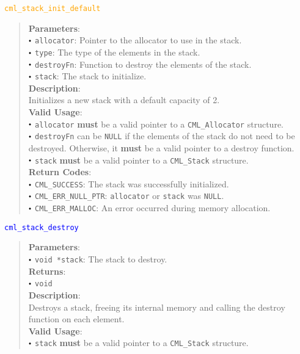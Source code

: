 \documentclass[a4paper,oneside,8pt]{extarticle}
\newcommand{\function}[1]{
  \noindent\textcolor{blue}{\texttt{#1}}
  \vspace{-0.3em}
}
\newcommand{\macro}[1]{
  \noindent\textcolor{orange}{\texttt{#1}}
  \vspace{-0.3em}
}
\renewcommand{\dot}{\raisebox{0.3ex}{\scalebox{0.6}{$\bullet$}}}
\theoremstyle{definition}
\begin{document}
\macro{cml\_stack\_init\_default}
\begin{quote}
  \textbf{Parameters}: \\
  $\dot$ \texttt{allocator}: Pointer to the allocator to use in the stack. \\
  $\dot$ \texttt{type}: The type of the elements in the stack. \\
  $\dot$ \texttt{destroyFn}: Function to destroy the elements of the stack. \\
  $\dot$ \texttt{stack}: The stack to initialize. \\
  
  \vspace{-0.75em}
  \textbf{Description}: \\
  Initializes a new stack with a default capacity of 2. \\

  \vspace{-0.75em}
  \textbf{Valid Usage}: \\
  $\dot$ \texttt{allocator} \textbf{must} be a valid pointer to a \texttt{CML\_Allocator} structure. \\
  $\dot$ \texttt{destroyFn} can be \texttt{NULL} if the elements of the stack do not need to be destroyed. Otherwise, it \textbf{must} be a valid pointer to a destroy function. \\
  $\dot$ \texttt{stack} \textbf{must} be a valid pointer to a \texttt{CML\_Stack} structure. \\

  \vspace{-0.75em}
  \textbf{Return Codes}: \\
  $\dot$ \texttt{CML\_SUCCESS}: The stack was successfully initialized. \\
  $\dot$ \texttt{CML\_ERR\_NULL\_PTR}: \texttt{allocator} or \texttt{stack} was \texttt{NULL}. \\
  $\dot$ \texttt{CML\_ERR\_MALLOC}: An error occurred during memory allocation. \\
\end{quote}

\function{cml\_stack\_destroy}
\begin{quote}
  \textbf{Parameters}: \\
  $\dot$ \texttt{void *stack}: The stack to destroy. \\
  \textbf{Returns}: \\
  $\dot$ \texttt{void} \\
  
  \vspace{-0.75em}
  \textbf{Description}: \\
  Destroys a stack, freeing its internal memory and calling the destroy function on each element. \\

  \vspace{-0.75em}
  \textbf{Valid Usage}: \\
  $\dot$ \texttt{stack} \textbf{must} be a valid pointer to a \texttt{CML\_Stack} structure. \\
\end{quote}
\end{document}
